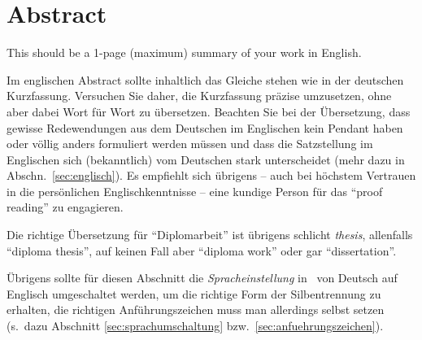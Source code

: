 \chapter{Abstract}

\begin{english} %
This should be a 1-page (maximum) summary of your work in English.
\end{english}

Im englischen Abstract sollte inhaltlich das Gleiche
stehen wie in der deutschen Kurzfassung. Versuchen Sie daher, die
Kurzfassung prä\-zise umzusetzen, ohne aber dabei Wort für Wort zu
übersetzen. Beachten Sie bei der Übersetzung, dass gewisse
Redewendungen aus dem Deutschen im Englischen kein Pendant haben
oder völlig anders formuliert werden müssen und dass die
Satzstellung im Englischen sich (bekanntlich) vom Deutschen stark
unterscheidet (mehr dazu in Abschn.\ \ref{sec:englisch}). Es
empfiehlt sich übrigens -- auch bei höchstem Vertrauen in die
persönlichen Englischkenntnisse -- eine kundige Person für das
"`proof reading"' zu engagieren.

Die richtige Übersetzung für "`Diplomarbeit"' ist übrigens
schlicht \emph{thesis}, allenfalls  "`diploma thesis"', auf keinen Fall aber "`diploma work"' oder gar "`dissertation"'. 

Übrigens sollte für diesen Abschnitt die \emph{Spracheinstellung} in \latex\ von Deutsch
auf Englisch umgeschaltet werden, um die richtige Form der
Silbentrennung zu erhalten, die richtigen Anführungszeichen muss
man allerdings selbst setzen %
(s.\ dazu Abschnitt \ref{sec:sprachumschaltung} %
bzw.\ \ref{sec:anfuehrungszeichen}).
